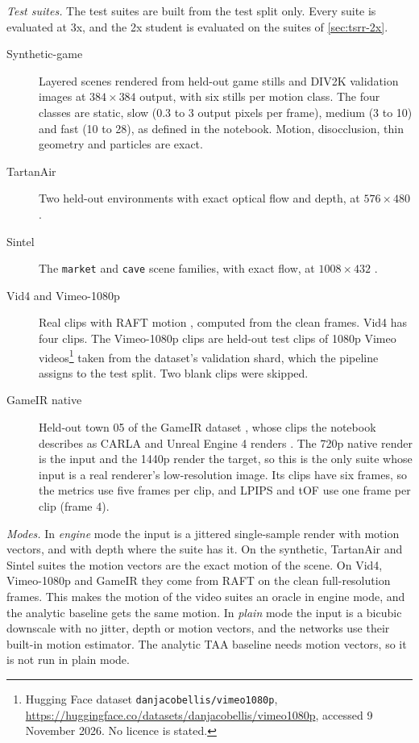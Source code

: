 \emph{Test suites.} The test suites are built from the test split only. Every suite is evaluated at 3x, and the 2x student is evaluated on the suites of \cref{sec:tsrr-2x}.
\begin{description}
\item[Synthetic-game] Layered scenes rendered from held-out game stills and DIV2K validation images \cite{agustsson2017div2k} at $384\times384$ output, with six stills per motion class. The four classes are static, slow (0.3 to 3 output pixels per frame), medium (3 to 10) and fast (10 to 28), as defined in the notebook. Motion, disocclusion, thin geometry and particles are exact.
\item[TartanAir] Two held-out environments with exact optical flow and depth, at $576\times480$ \cite{wang2020tartanair}.
\item[Sintel] The \texttt{market} and \texttt{cave} scene families, with exact flow, at $1008\times432$ \cite{butler2012sintel}.
\item[Vid4 and Vimeo-1080p] Real clips with RAFT motion \cite{teed2020raft}, computed from the clean frames. Vid4 \cite{liu2014vid4} has four clips. The Vimeo-1080p clips are held-out test clips of 1080p Vimeo videos\footnote{Hugging Face dataset \texttt{danjacobellis/vimeo1080p}, \url{https://huggingface.co/datasets/danjacobellis/vimeo1080p}, accessed 9 November 2026. No licence is stated.} taken from the dataset's validation shard, which the pipeline assigns to the test split. Two blank clips were skipped.
\item[GameIR native] Held-out town 05 of the GameIR dataset \cite{zhou2024gameir}, whose clips the notebook describes as CARLA and Unreal Engine 4 renders \cite{dosovitskiy2017carla}. The 720p native render is the input and the 1440p render the target, so this is the only suite whose input is a real renderer's low-resolution image. Its clips have six frames, so the metrics use five frames per clip, and LPIPS and tOF use one frame per clip (frame 4).
\end{description}

\emph{Modes.} In \emph{engine} mode the input is a jittered single-sample render with motion vectors, and with depth where the suite has it. On the synthetic, TartanAir and Sintel suites the motion vectors are the exact motion of the scene. On Vid4, Vimeo-1080p and GameIR they come from RAFT on the clean full-resolution frames. This makes the motion of the video suites an oracle in engine mode, and the analytic baseline gets the same motion. In \emph{plain} mode the input is a bicubic downscale with no jitter, depth or motion vectors, and the networks use their built-in motion estimator. The analytic TAA baseline needs motion vectors, so it is not run in plain mode.

